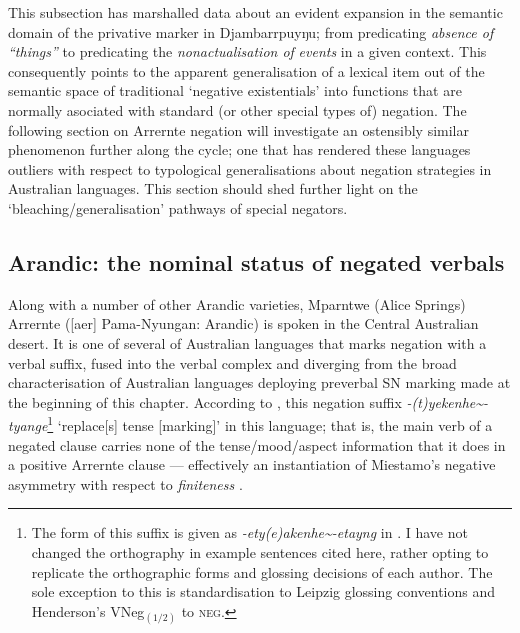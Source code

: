This subsection has marshalled data about an evident expansion in the semantic domain of the privative marker in Djambarrpuyŋu; from predicating\textit{ absence of ``things''} to predicating the \textit{nonactualisation of }\textit{events} in a given context. This consequently points to the apparent generalisation of a lexical item out of the semantic space of traditional `negative existentials' into functions that are normally asociated with standard (or other special types of) negation. The following section on Arrernte negation will investigate an ostensibly similar phenomenon further along the cycle; one that has rendered these languages outliers with respect to typological generalisations about negation strategies in Australian languages. This section should shed further light on the `bleaching/generalisation' pathways of special negators.


\subsection{Arandic: the nominal status of negated verbals}\label{ar}



Along with a number of other Arandic varieties, Mparntwe (Alice Springs) Arrernte ([\gls{aer}] Pama-Nyungan: Arandic) is spoken in the Central Australian desert. It is one of several of Australian languages that marks negation with a verbal suffix, fused into the verbal complex and diverging from the broad characterisation of Australian languages deploying preverbal SN marking made at the beginning of this chapter.  According to \citet[71]{Wilkins1989}, this negation suffix \textit{-(t)yekenhe\textasciitilde-tyange}\footnote{The form of this suffix is given as \textit{-ety(e)\textdblhyphen akenhe\textasciitilde-etayng} in \citealt{Henderson2013}. I have not changed the orthography in example sentences cited here, rather opting to replicate the orthographic forms and glossing decisions of each author. The sole exception to this is standardisation to Leipzig glossing conventions and Henderson's VNeg$_{(1/2)} $ to \textsc{neg}.} `replace[s] tense [marking]' in this language; that is, the main verb of a negated clause carries none of the tense/mood/aspect information that it does in a positive Arrernte clause --- effectively an instantiation of Miestamo's negative asymmetry with respect to \textit{finiteness} \citeyearpar[\texttt{A/Fin}][73ff]{Miestamo2005}.


